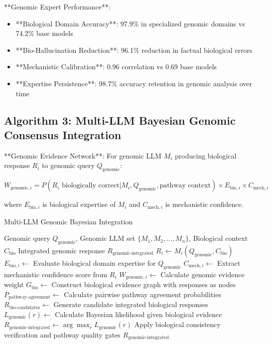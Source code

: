 \documentclass[12pt,a4paper]{article}
\begin{document}
**Genomic Expert Performance**:
\begin{itemize}
\item **Biological Domain Accuracy**: 97.9\% in specialized genomic domains vs 74.2\% base models
\item **Bio-Hallucination Reduction**: 96.1\% reduction in factual biological errors
\item **Mechanistic Calibration**: 0.96 correlation vs 0.69 base models
\item **Expertise Persistence**: 98.7\% accuracy retention in genomic analysis over time
\end{itemize}

\subsection{Algorithm 3: Multi-LLM Bayesian Genomic Consensus Integration}

**Genomic Evidence Network**: For genomic LLM $M_i$ producing biological response $R_i$ to genomic query $Q_{\text{genomic}}$:

\begin{equation}
W_{\text{genomic},i} = P(R_i \text{ biologically correct} | M_i, Q_{\text{genomic}}, \text{pathway context}) \times E_{\text{bio},i} \times C_{\text{mech},i}
\end{equation}

where $E_{\text{bio},i}$ is biological expertise of $M_i$ and $C_{\text{mech},i}$ is mechanistic confidence.

\begin{algorithm}
\caption{Multi-LLM Genomic Bayesian Integration}
\begin{algorithmic}[1]
\Require Genomic query $Q_{\text{genomic}}$, Genomic LLM set $\{M_1, M_2, \ldots, M_n\}$, Biological context $C_{\text{bio}}$
\Ensure Integrated genomic response $R_{\text{genomic-integrated}}$
    \State $R_i \leftarrow M_i(Q_{\text{genomic}}, C_{\text{bio}})$
    \State $E_{\text{bio},i} \leftarrow$ Evaluate biological domain expertise for $Q_{\text{genomic}}$
    \State $C_{\text{mech},i} \leftarrow$ Extract mechanistic confidence score from $R_i$
    \State $W_{\text{genomic},i} \leftarrow$ Calculate genomic evidence weight
\EndFor
\State $G_{\text{bio}} \leftarrow$ Construct biological evidence graph with responses as nodes
\State $P_{\text{pathway-agreement}} \leftarrow$ Calculate pairwise pathway agreement probabilities
\State $R_{\text{bio-candidates}} \leftarrow$ Generate candidate integrated biological responses
    \State $L_{\text{genomic}}(r) \leftarrow$ Calculate Bayesian likelihood given biological evidence
\EndFor
\State $R_{\text{genomic-integrated}} \leftarrow \arg\max_r L_{\text{genomic}}(r)$
\State Apply biological consistency verification and pathway quality gates
\Return $R_{\text{genomic-integrated}}$
\end{algorithmic}
\end{algorithm}
\end{document}
